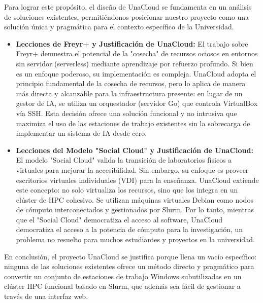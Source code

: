 Para lograr este propósito, el diseño de UnaCloud se fundamenta en un análisis de soluciones existentes, permitiéndonos posicionar nuestro proyecto como una solución única y pragmática para el contexto específico de la Universidad.

\begin{itemize}
    \item \textbf{Lecciones de Freyr+ y Justificación de UnaCloud:} El trabajo sobre Freyr+ demuestra el potencial de la "cosecha" de recursos ociosos en entornos sin servidor (serverless) mediante aprendizaje por refuerzo profundo. Si bien es un enfoque poderoso, su implementación es compleja. UnaCloud adopta el principio fundamental de la cosecha de recursos, pero lo aplica de manera más directa y alcanzable para la infraestructura presente: en lugar de un gestor de IA, se utiliza un orquestador (servidor Go) que controla VirtualBox vía SSH. Esta decisión ofrece una solución funcional y no intrusiva que maximiza el uso de las estaciones de trabajo existentes sin la sobrecarga de implementar un sistema de IA desde cero.
    \item \textbf{Lecciones del Modelo "Social Cloud" y Justificación de UnaCloud:} El modelo "Social Cloud" valida la transición de laboratorios físicos a virtuales para mejorar la accesibilidad. Sin embargo, su enfoque es proveer escritorios virtuales individuales (VDI) para la enseñanza. UnaCloud extiende este concepto: no solo virtualiza los recursos, sino que los integra en un clúster de HPC cohesivo. Se utilizan máquinas virtuales Debian como nodos de cómputo interconectados y gestionados por Slurm. Por lo tanto, mientras que el "Social Cloud" democratiza el acceso al software, UnaCloud democratiza el acceso a la potencia de cómputo para la investigación, un problema no resuelto para muchos estudiantes y proyectos en la universidad.
\end{itemize} 

En conclusión, el proyecto UnaCloud se justifica porque llena un vacío específico: ninguna de las soluciones existentes ofrece un método directo y pragmático para convertir un conjunto de estaciones de trabajo Windows subutilizadas en un clúster HPC funcional basado en Slurm, que además sea fácil de gestionar a través de una interfaz web.